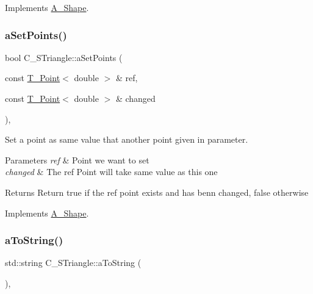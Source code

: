 Implements \hyperlink{classA__Shape_a25b4e0c34cdb46da5382fe9c7467efaf}{A\+\_\+\+Shape}.

\mbox{\label{classC__STriangle_a431802d5e10b69f535e7929a23963b5e}} 
\subsubsection{\texorpdfstring{a\+Set\+Points()}{aSetPoints()}}
{\footnotesize\ttfamily bool C\+\_\+\+S\+Triangle\+::a\+Set\+Points (\begin{DoxyParamCaption}\item[{const \hyperlink{classT__Point}{T\+\_\+\+Point}$<$ double $>$ \&}]{ref,  }\item[{const \hyperlink{classT__Point}{T\+\_\+\+Point}$<$ double $>$ \&}]{changed }\end{DoxyParamCaption})\hspace{0.3cm}{\ttfamily [override]}, {\ttfamily [virtual]}}



Set a point as same value that another point given in parameter. 


\begin{DoxyParams}{Parameters}
{\em ref} & Point we want to set \\
\hline
{\em changed} & The ref Point will take same value as this one \\
\hline
\end{DoxyParams}
\begin{DoxyReturn}{Returns}
Return true if the ref point exists and has benn changed, false otherwise 
\end{DoxyReturn}


Implements \hyperlink{classA__Shape_a6996f454b337f8425ad13cba3f7a7c35}{A\+\_\+\+Shape}.

\mbox{\label{classC__STriangle_a1ea089f6a82c2770e0529c4a9fc07d90}} 
\subsubsection{\texorpdfstring{a\+To\+String()}{aToString()}}
{\footnotesize\ttfamily std\+::string C\+\_\+\+S\+Triangle\+::a\+To\+String (\begin{DoxyParamCaption}{ }\end{DoxyParamCaption})\hspace{0.3cm}{\ttfamily [override]}, {\ttfamily [virtual]}}




